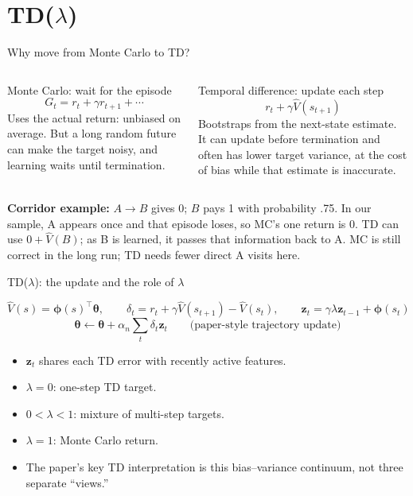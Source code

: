 \documentclass[aspectratio=169,11pt]{beamer}
\newcommand{\memberB}{Member B}
\newcommand{\speaker}[1]{} %
\newcommand{\vphi}{\bm{\phi}}
\newcommand{\vz}{\mathbf{z}}
\newcommand{\vth}{\bm{\theta}}
\begin{document}
\section{TD($\lambda$)}

\begin{frame}{Why move from Monte Carlo to TD?}
  \speaker{\memberB}
  \small
  \begin{columns}[T]
    \begin{block}{Monte Carlo: wait for the episode}
      \[G_t=r_t+\gamma r_{t+1}+\cdots\]
      Uses the actual return: unbiased on average. But a long random future can make the target noisy, and learning waits until termination.
    \end{block}
    \begin{block}{Temporal difference: update each step}
      \[r_t+\gamma\hat V(s_{t+1})\]
      Bootstraps from the next-state estimate. It can update before termination and often has lower target variance, at the cost of bias while that estimate is inaccurate.
    \end{block}
  \end{columns}
  \begin{keyidea}
    \small
    \textbf{Corridor example:} $A\to B$ gives 0; $B$ pays 1 with probability .75. In our sample, A appears once and that episode loses, so MC's one return is 0. TD can use $0+\hat V(B)$; as B is learned, it passes that information back to A. MC is still correct in the long run; TD needs fewer direct A visits here.
  \end{keyidea}
\end{frame}

\begin{frame}{TD($\lambda$): the update and the role of $\lambda$}
  \speaker{\memberB}
  \small
  \[\hat V(s)=\vphi(s)^\top\vth,\qquad
    \delta_t=r_t+\gamma\hat V(s_{t+1})-\hat V(s_t),\qquad
    \vz_t=\gamma\lambda\vz_{t-1}+\vphi(s_t)\]
  \[\vth\leftarrow\vth+\alpha_n\sum_t\delta_t\vz_t\qquad\text{(paper-style trajectory update)}\]
    \begin{itemize}
      \item $\vz_t$ shares each TD error with recently active features.
      \item $\lambda=0$: one-step TD target.
      \item $0<\lambda<1$: mixture of multi-step targets.
      \item $\lambda=1$: Monte Carlo return.
      \item The paper's key TD interpretation is this bias--variance continuum, not three separate ``views.''
    \end{itemize}
\end{frame}
\end{document}
